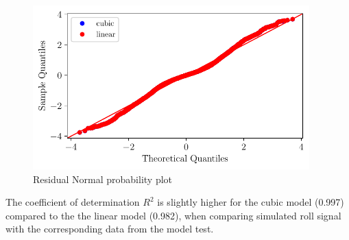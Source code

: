 \begin{figure}[H]
\begin{center}\includegraphics[width = 0.95\textwidth]{figures/residual_normal_probability_plot.pdf}\end{center}
\vspace{-0.7cm}
\caption{Residual Normal probability plot}
\label{fig:residual_normal_probability_plot}
\end{figure}
The coefficient of determination $R^2$ is slightly higher for the
cubic model (0.997) compared to the the linear model (0.982), when
comparing simulated roll signal with the corresponding data from the
model test.
